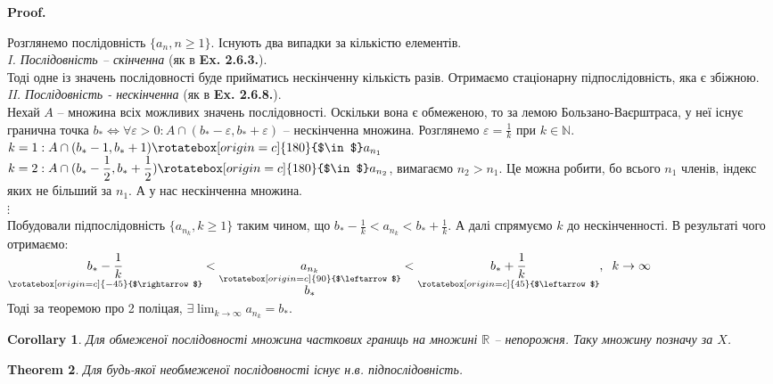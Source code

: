 \documentclass[a4paper, 14pt]{article}
\makeatletter
\def\qed{$\blacksquare$}
\theoremstyle{theoremdd}
\newtheorem{theorem}{Theorem}[subsection]
\theoremstyle{theoremdd}
\theoremstyle{theoremdd}
\theoremstyle{theoremdd}
\theoremstyle{theoremdd}
\theoremstyle{theoremdd}
\theoremstyle{theoremdd}
\theoremstyle{theoremdd}
\newtheorem{corollary}[theorem]{Corollary}
\renewenvironment{proof}[1][Proof.\\]{\par
\pushQED{\hfill \qed}%
\normalfont \topsep6\p@\@plus6\p@\relax
\trivlist
\item\relax
{\bfseries
#1\@addpunct{.}}\hspace\labelsep\ignorespaces
}{%
\popQED\endtrivlist\@endpefalse
}
\makeatother
\begin{document}
	\begin{proof}
	Розглянемо послідовність $\{a_n, n \geq 1\}$. Існують два випадки за кількістю елементів.
	\bigskip \\
	\textit{I. Послідовність -- скінченна} (як в \textbf{Ex. 2.6.3.}). \\
	Тоді одне із значень послідовності буде прийматись нескінченну кількість разів. Отримаємо стаціонарну підпослідовність, яка є збіжною.
	\bigskip \\
	\textit{II. Послідовність - нескінченна} (як в \textbf{Ex. 2.6.8.}). \\
	Нехай $A$ -- множина всіх можливих значень послідовності. Оскільки вона є обмеженою, то за лемою Бользано-Ваєрштраса, у неї існує гранична точка $b_* \iff \forall \varepsilon > 0:A \cap (b_*-\varepsilon, b_*+\varepsilon)$ -- нескінченна множина. Розглянемо $\varepsilon = \displaystyle \frac{1}{k}$ при $k \in \mathbb{N}$.\\
	$\displaystyle k = 1: A \cap(b_*-1, b_*+1) \rotatebox[origin=c]{180}{$\in$}a_{n_1}$\\
	$\displaystyle k = 2: A \cap(b_*-\frac{1}{2}, b_*+\frac{1}{2}) \rotatebox[origin=c]{180}{$\in$}a_{n_2}$, вимагаємо $n_2>n_1$. Це можна робити, бо всього $n_1$ членів, індекс яких не більший за $n_1$. А у нас нескінченна множина.\\
	$\vdots$\\
	Побудовали підпослідовність $\{a_{n_k}, k \geq 1\}$ таким чином, що $\displaystyle b_*-\frac{1}{k} < a_{n_k} < b_*+\frac{1}{k}$. А далі спрямуємо $k$ до нескінченності. В результаті чого отримаємо:\\
	$\displaystyle \underset{\rotatebox[origin=c]{-45}{$\rightarrow$}}{b_*-\frac{1}{k}} < \underset{\underset{\displaystyle b_*}{\rotatebox[origin=c]{90}{$\leftarrow$}}}{a_{n_k}} < \underset{\rotatebox[origin=c]{45}{$\leftarrow$}}{b_*+\frac{1}{k}}, \hspace{0.2cm} k \to \infty$\\
	Тоді за теоремою про 2 поліцая, $\displaystyle \exists \lim_{k \to \infty} a_{n_k} = b_*$.
	\end{proof}
	
	\begin{corollary}
	Для обмеженої послідовності множина часткових границь на множині $\mathbb{R}$ -- непорожня. Таку множину позначу за $X$.
	\end{corollary}
		
	\begin{theorem} Для будь-якої необмеженої послідовності існує н.в. підпослідовність.
	\end{theorem}
	
\end{document}
